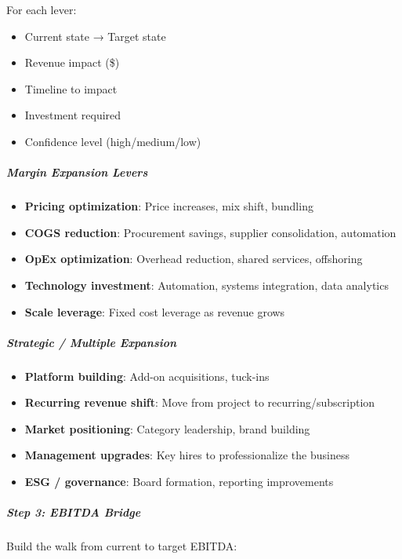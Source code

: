 \documentclass[11pt]{article}
\begin{document}
For each lever:

\begin{itemize}[leftmargin=*,itemsep=2pt,topsep=2pt]
\item {} Current state → Target state
\item {} Revenue impact (\$)
\item {} Timeline to impact
\item {} Investment required
\item {} Confidence level (high/medium/low)
\end{itemize}

\subparagraph{Margin Expansion Levers}\mbox{}\par
\begin{itemize}[leftmargin=*,itemsep=2pt,topsep=2pt]
\item {} \textbf{Pricing optimization}: Price increases, mix shift, bundling
\item {} \textbf{COGS reduction}: Procurement savings, supplier consolidation, automation
\item {} \textbf{OpEx optimization}: Overhead reduction, shared services, offshoring
\item {} \textbf{Technology investment}: Automation, systems integration, data analytics
\item {} \textbf{Scale leverage}: Fixed cost leverage as revenue grows
\end{itemize}

\subparagraph{Strategic / Multiple Expansion}\mbox{}\par
\begin{itemize}[leftmargin=*,itemsep=2pt,topsep=2pt]
\item {} \textbf{Platform building}: Add-on acquisitions, tuck-ins
\item {} \textbf{Recurring revenue shift}: Move from project to recurring/subscription
\item {} \textbf{Market positioning}: Category leadership, brand building
\item {} \textbf{Management upgrades}: Key hires to professionalize the business
\item {} \textbf{ESG / governance}: Board formation, reporting improvements
\end{itemize}

\subparagraph{Step 3: EBITDA Bridge}\mbox{}\par

Build the walk from current to target EBITDA:
\end{document}
